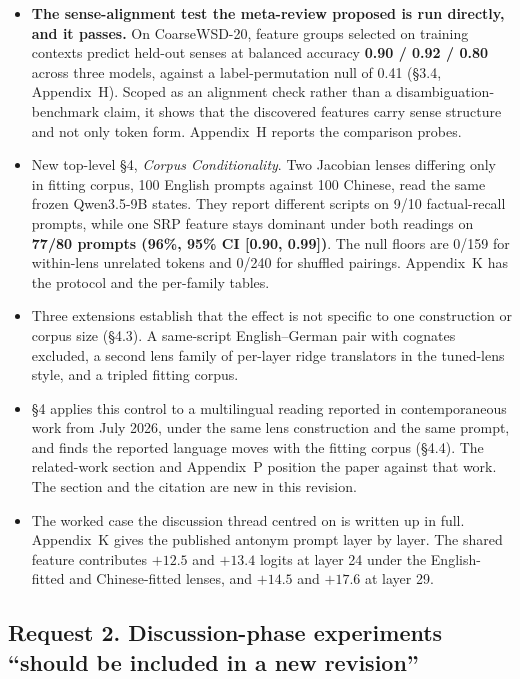 \documentclass[11pt]{article}
\begin{document}
\begin{itemize}
\item \textbf{The sense-alignment test the meta-review proposed is run
directly, and it passes.} On CoarseWSD-20, feature groups selected on
training contexts predict held-out senses at balanced accuracy \textbf{0.90 /
0.92 / 0.80} across three models, against a label-permutation null of 0.41
(\S3.4, Appendix~H). Scoped as an alignment check rather than a
disambiguation-benchmark claim, it shows that the discovered features carry
sense structure and not only token form. Appendix~H reports the
comparison probes.
\item New top-level \S4, \emph{Corpus Conditionality}. Two Jacobian lenses
differing only in fitting corpus, 100
English prompts against 100 Chinese, read the same frozen Qwen3.5-9B states.
They report different scripts on 9/10 factual-recall prompts, while one SRP
feature stays dominant under both readings on \textbf{77/80 prompts (96\%,
95\% CI [0.90, 0.99])}. The null floors are 0/159 for within-lens unrelated
tokens and 0/240 for shuffled pairings. Appendix~K has the protocol and the
per-family tables.
\item Three extensions establish that the effect is not specific to one
construction or corpus size (\S4.3). A same-script
English--German pair with cognates excluded, a second lens family of
per-layer ridge translators in the tuned-lens style, and a tripled fitting
corpus.
\item \S4 applies this control to a multilingual reading reported in
contemporaneous work from July 2026, under the same lens construction and the
same prompt, and finds the reported language moves with the fitting corpus
(\S4.4). The related-work section and Appendix~P position the
paper against that work. The section and the citation are new in this
revision.
\item The worked case the discussion thread centred on is written up in full.
Appendix~K gives the published antonym prompt layer by
layer. The shared feature contributes $+12.5$ and $+13.4$ logits at layer 24
under the English-fitted and Chinese-fitted lenses, and $+14.5$ and $+17.6$
at layer 29.
\end{itemize}

\subsection*{Request 2. Discussion-phase experiments ``should be included in
a new revision''}
\end{document}
